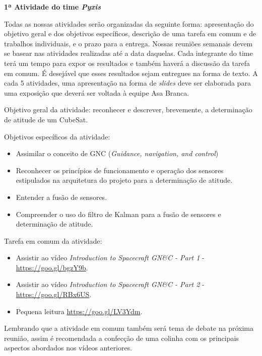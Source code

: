 \documentclass{article}
\begin{document}
\begin{center}
    {\bf \huge  1ª Atividade do time \textit{Pyxis}}\\[1.1cm] 
\end{center}
Todas as nossas atividades serão organizadas da seguinte forma: apresentação do objetivo geral e dos objetivos específicos, descrição de uma tarefa em comum e de trabalhos individuais, e o prazo para a entrega. Nossas reuniões semanais devem se basear nas atividades realizadas até a data daquelas. Cada integrante do time terá um tempo para expor os resultados e também haverá a discussão da tarefa em comum. É desejável que esses resultados sejam entregues na forma de texto. A cada 5 atividades, uma apresentação na forma de \textit{slides} deve ser elaborada para uma exposição que deverá ser voltada à equipe Asa Branca.
\begin{doublespace}
\end{doublespace}
Objetivo geral da atividade: reconhecer e descrever, brevemente, a determinação de atitude de um CubeSat.
\begin{doublespace}
\end{doublespace}
Objetivos específicos da atividade:
\begin{itemize}
    \item Assimilar o conceito de GNC (\textit{Guidance, navigation, and control})
    \item Reconhecer os princípios de funcionamento e operação dos sensores estipulados na arquitetura do projeto para a determinação de atitude.
    \item Entender a fusão de sensores.
    \item Compreender o uso do filtro de Kalman para a fusão de sensores e determinação de atitude.
\end{itemize}
\begin{doublespace}
\end{doublespace}
Tarefa em comum da atividade:
\begin{itemize}
    \item Assistir ao vídeo \textit{Introduction to Spacecraft GN\&C - Part 1} - \url{https://goo.gl/bgzY9b}.
    \item Assistir ao vídeo \textit{Introduction to Spacecraft GN\&C - Part 2} - \url{https://goo.gl/RBx6US}.
    \item Pequena leitura \url{https://goo.gl/LV3Ydm}.
\end{itemize}

Lembrando que a atividade em comum também será tema de debate na próxima reunião, assim é recomendada a confecção de uma colinha com os principais aspectos abordados nos vídeos anteriores. 
\end{document}
